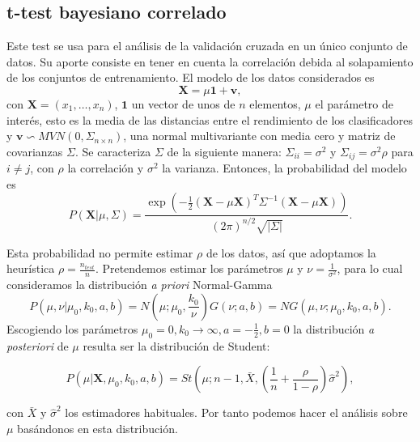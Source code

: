 \subsection{t-test bayesiano correlado}
	\label{ssec:bayes-ttest}
	Este test se usa para el análisis de la validación
cruzada en un único conjunto de datos. Su aporte consiste en 
tener en cuenta la correlación debida al solapamiento de los 
conjuntos de entrenamiento. El modelo de los datos 
considerados es
	\[ \mathbf{X} = \mu \mathbf{1} + \mathbf{v}, \]
	con $\mathbf{X} = (x_1, \dots, x_n)$, $\mathbf{1}$ un 
vector de unos de $n$ elementos, $\mu$ el parámetro de
interés, esto es la media de las distancias entre el 
rendimiento de los clasificadores y $\mathbf{v} \backsim 
MVN(0, \Sigma_{n \times n})$, una normal multivariante con
media cero y matriz de covarianzas $\Sigma$. Se caracteriza
$\Sigma$ de la siguiente manera: $\Sigma_{ii} = \sigma^2$
y $\Sigma_{ij} = \sigma^2 \rho$ para $i \neq j$, con $\rho$
la correlación y $\sigma^2$ la varianza. Entonces,
la probabilidad del modelo es 
	\[ 
		P(\mathbf{X} | \mu, \Sigma) = 
		\frac{\exp\left(
				-\frac{1}{2}
				(\mathbf{X}-\mu\mathbf{X})^T
				\Sigma^{-1}
				(\mathbf{X}-\mu\mathbf{X})
			\right)}
		{(2\pi)^{n/2} \sqrt{|\Sigma|}}.
	\]

	Esta probabilidad no permite estimar $\rho$ de los datos, 
así que adoptamos la heurística $\rho = \frac{n_{test}}{n}$. 
Pretendemos estimar los parámetros $\mu$ y $\nu = 
\frac{1}{\sigma^2}$, para lo cual consideramos la 
distribución \textit{a priori} Normal-Gamma
	\[
		P(\mu, \nu | \mu_0, k_0, a, b) =
			N\left(\mu; \mu_0, \frac{k_0}{\nu} \right)
			G(\nu; a, b) = 
			NG(\mu, \nu ; \mu_0, k_0, a, b).
	\]
	Escogiendo los parámetros $\mu_0 = 0, k_0 \rightarrow 
\infty, a = -\frac{1}{2}, b=0$ la distribución \textit{a 
posteriori} de $\mu$ resulta ser la distribución de Student:
	
	\[
		P(\mu | \mathbf{X}, \mu_0, k_0, a, b) =
			St \left(
					\mu; n-1 , \bar{X},
					\left( \frac{1}{n} + 
							\frac{\rho}{1 - \rho} 
					\right) \hat{\sigma}^2
			   \right),
	\]

	con $\bar{X}$ y $\hat{\sigma}^2$ los estimadores 
habituales. Por tanto podemos hacer el análisis sobre $\mu$ 
basándonos en esta distribución.


